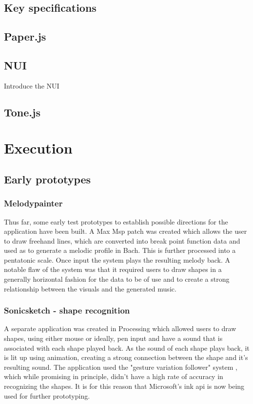 \documentclass[a4paper,12pt]{article}
\begin{document}
\subsection{Key specifications}
\label{sec:org5cd5246}
\subsection{Paper.js}
\label{sec:orgfdaf4fd}
\subsection{NUI}
\label{sec:orgefb49b6}
Introduce the NUI
\subsection{Tone.js}
\label{sec:org2c4343f}
\cite{mann_interactive_2015}

\section{Execution}
\label{sec:orgce589e3}
\subsection{Early prototypes}
\label{sec:org9eb27cf}
\subsubsection{Melodypainter}
\label{sec:org22be26a}
Thus far, some early test prototypes to establish possible directions for the
application have been built. A Max Msp patch was created which allows the user
to draw freehand lines, which are converted into break point function data and
used as to generate a melodic profile in Bach. This is further processed into a
pentatonic scale. Once input the system plays the resulting melody back. A
notable flaw of the system was that it required users to draw shapes in a
generally horizontal fashion for the data to be of use and to create a strong
relationship between the visuals and the generated music.

\subsubsection{Sonicsketch - shape recognition}
\label{sec:org6d2a166}
A separate application was created in Processing which allowed users to draw
shapes, using either mouse or ideally, pen input and have a sound that is
associated with each shape played back. As the sound of each shape plays back,
it is lit up using animation, creating a strong connection between the shape and
it's resulting sound. The application used the "gesture variation follower"
system \cite{caramiaux_adaptive_2015}, which while promising in principle, didn't
have a high rate of accuracy in recognizing the shapes. It is for this reason
that Microsoft's ink api is now being used for further prototyping.
\end{document}
